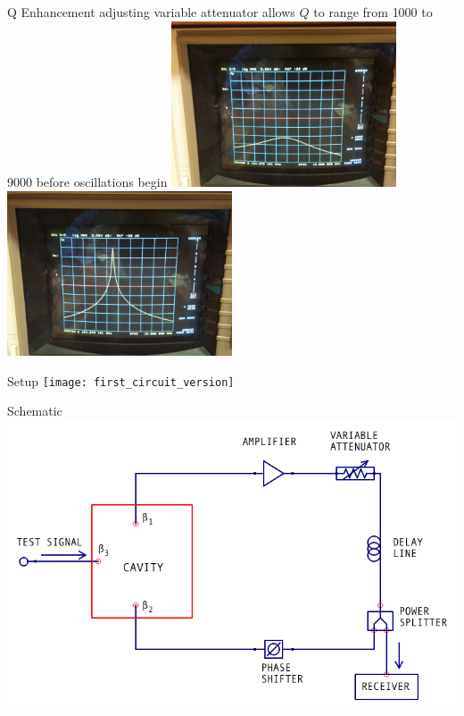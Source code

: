 \documentclass{beamer}
\begin{document}
\begin{frame}{Q Enhancement}
{\tiny adjusting variable attenuator allows $Q$ to range from 1000 to 9000 before oscillations begin}
\includegraphics[width=0.5\textwidth]{low_q}
\includegraphics[width=0.5\textwidth]{high_q}
\end{frame}

\begin{frame}{Setup}
\texttt{[image: first\_circuit\_version]}
\end{frame}


\begin{frame}{Schematic}
\includegraphics[width=\textwidth]{no_isolator}
\end{frame}
\end{document}
